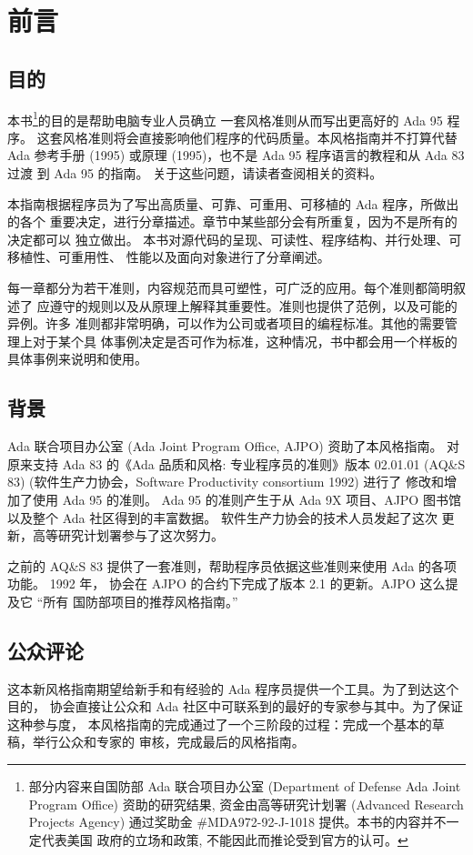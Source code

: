 \chapter{前言}
\pagestyle{empty}

\section{目的}
本书\footnote{部分内容来自国防部 Ada 联合项目办公室 (Department of Defense Ada
Joint Program Office) 资助的研究结果, 资金由高等研究计划署 (Advanced Research
Projects Agency) 通过奖助金 \#MDA972-92-J-1018 提供。本书的内容并不一定代表美国
政府的立场和政策, 不能因此而推论受到官方的认可。}的目的是帮助电脑专业人员确立
一套风格准则从而写出更高好的 Ada 95 程序。
这套风格准则将会直接影响他们程序的代码质量。本风格指南并不打算代替 Ada
参考手册 (1995) 或原理 (1995)，也不是 Ada 95 程序语言的教程和从 Ada 83 过渡
到 Ada 95 的指南。 关于这些问题，请读者查阅相关的资料。

本指南根据程序员为了写出高质量、可靠、可重用、可移植的 Ada 程序，所做出的各个
重要决定，进行分章描述。章节中某些部分会有所重复，因为不是所有的决定都可以
独立做出。 本书对源代码的呈现、可读性、程序结构、并行处理、可移植性、可重用性、
性能以及面向对象进行了分章阐述。

每一章都分为若干准则，内容规范而具可塑性，可广泛的应用。每个准则都简明叙述了
应遵守的规则以及从原理上解释其重要性。准则也提供了范例，以及可能的异例。许多
准则都非常明确，可以作为公司或者项目的编程标准。其他的需要管理上对于某个具
体事例决定是否可作为标准，这种情况，书中都会用一个样板的具体事例来说明和使用。

\section{背景}
Ada 联合项目办公室 (Ada Joint Program Office, AJPO) 资助了本风格指南。
对原来支持 Ada 83 的《Ada 品质和风格: 专业程序员的准则》版本 02.01.01
 (AQ\&S 83) (软件生产力协会，Software Productivity consortium 1992) 进行了
修改和增加了使用 Ada 95 的准则。 Ada 95 的准则产生于从 Ada 9X 项目、AJPO
图书馆以及整个 Ada 社区得到的丰富数据。 软件生产力协会的技术人员发起了这次
更新，高等研究计划署参与了这次努力。

之前的 AQ\&S 83 提供了一套准则，帮助程序员依据这些准则来使用 Ada 的各项功能。
1992 年， 协会在 AJPO 的合约下完成了版本 2.1 的更新。AJPO 这么提及它 ``所有
国防部项目的推荐风格指南。''

\section{公众评论}
这本新风格指南期望给新手和有经验的 Ada 程序员提供一个工具。为了到达这个目的，
协会直接让公众和 Ada 社区中可联系到的最好的专家参与其中。为了保证这种参与度，
本风格指南的完成通过了一个三阶段的过程：完成一个基本的草稿，举行公众和专家的
审核，完成最后的风格指南。

